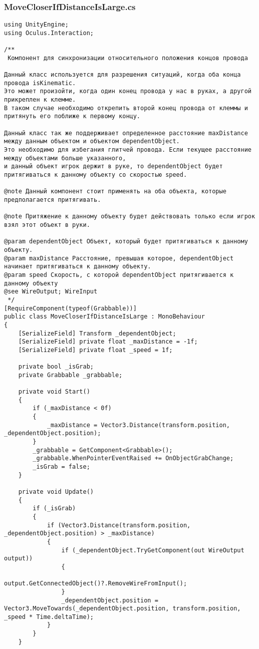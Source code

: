 \subsubsection*{MoveCloserIfDistanceIsLarge.cs}
\begin{verbatim}
﻿using UnityEngine;
using Oculus.Interaction;

/**
 Компонент для синхронизации относительного положения концов провода

Данный класс используется для разрешения ситуаций, когда оба конца провода isKinematic.
Это может произойти, когда один конец провода у нас в руках, а другой прикреплен к клемме.
В таком случае необходимо открепить второй конец провода от клеммы и притянуть его поближе к первому концу.

Данный класс так же поддерживает определенное расстояние maxDistance между данным объектом и объектом dependentObject.
Это необходимо для избегания глитчей провода. Если текущее расстояние между объектами больше указанного, 
и данный объект игрок держит в руке, то dependentObject будет притягиваться к данному объекту со скоростью speed.

@note Данный компонент стоит применять на оба объекта, которые предполагается притягивать.

@note Притяжение к данному объекту будет действовать только если игрок взял этот объект в руки.

@param dependentObject Объект, который будет притягиваться к данному объекту.
@param maxDistance Расстояние, превышая которое, dependentObject начинает притягиваться к данному объекту.
@param speed Скорость, с которой dependentObject притягивается к данному объекту
@see WireOutput; WireInput
 */
[RequireComponent(typeof(Grabbable))]
public class MoveCloserIfDistanceIsLarge : MonoBehaviour
{
    [SerializeField] Transform _dependentObject;
    [SerializeField] private float _maxDistance = -1f;
    [SerializeField] private float _speed = 1f;

    private bool _isGrab;
    private Grabbable _grabbable;

    private void Start()
    {
        if (_maxDistance < 0f)
        {
            _maxDistance = Vector3.Distance(transform.position, _dependentObject.position);
        }
        _grabbable = GetComponent<Grabbable>();
        _grabbable.WhenPointerEventRaised += OnObjectGrabChange;
        _isGrab = false;
    }

    private void Update()
    {
        if (_isGrab)
        {
            if (Vector3.Distance(transform.position, _dependentObject.position) > _maxDistance)
            {
                if (_dependentObject.TryGetComponent(out WireOutput output))
                {
                    output.GetConnectedObject()?.RemoveWireFromInput();
                }
                _dependentObject.position = Vector3.MoveTowards(_dependentObject.position, transform.position, _speed * Time.deltaTime);
            }
        }
    }


\end{verbatim}
